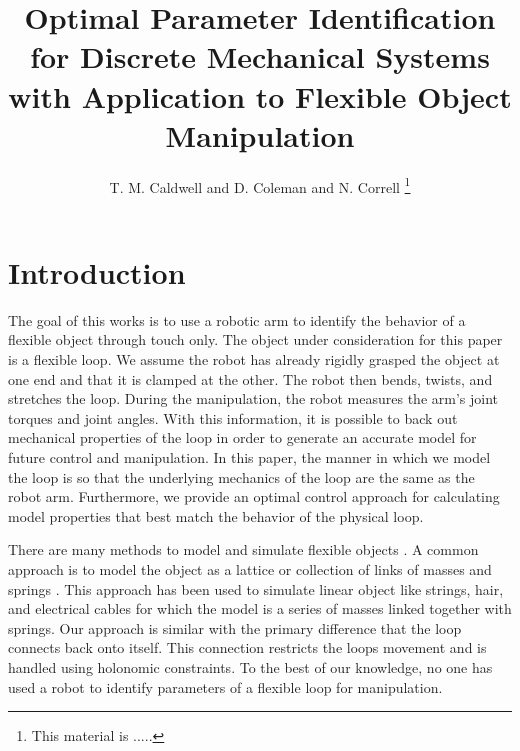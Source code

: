 \documentclass[letterpaper, 10pt, conference]{ieeeconf}
\title{Optimal Parameter Identification for Discrete Mechanical Systems with Application to Flexible Object Manipulation}
\author{T. M. Caldwell and  D. Coleman and N. Correll%
\thanks{
This material is .....}%
}
\begin{document}
\maketitle

\begin{abstract}




\end{abstract}

\section{Introduction}
The goal of this works is to use a robotic arm to identify the behavior of a flexible object through touch only.  The object under consideration for this paper is a flexible loop.  We assume the robot has already rigidly grasped the object at one end and that it is clamped at the other.  The robot then bends, twists, and stretches the loop.  During the manipulation, the robot measures the arm's joint torques and joint angles.  With this information, it is possible to back out mechanical properties of the loop in order to generate an accurate model for future control and manipulation.  In this paper, the manner in which we model the loop is so that the underlying mechanics of the loop are the same as the robot arm.  Furthermore, we provide an optimal control approach for calculating model properties that best match the behavior of the physical loop.

There are many methods to model and simulate flexible objects \cite{khalil_payeur, lang_etal}.  A common approach is to model the object as a lattice or collection of links of masses and springs \cite{sahari_etal, wakamatsu_etal, khalil_payeur}.  This approach has been used to simulate linear object like strings, hair, and electrical cables for which the model is a series of masses linked together with springs.   Our approach is similar with the primary difference that the loop connects back onto itself.  This connection restricts the loops movement and is handled using holonomic constraints.  To the best of our knowledge, no one has used a robot to identify parameters of a flexible loop for manipulation.
\end{document}
